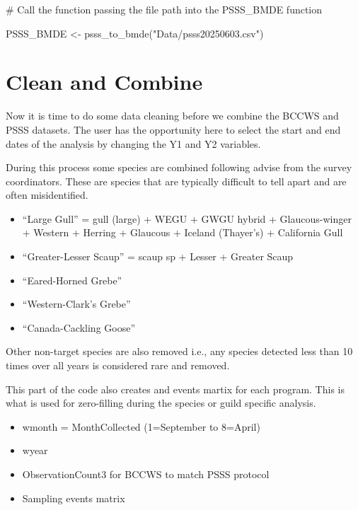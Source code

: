 \documentclass[
  letterpaper,
  DIV=11,
  numbers=noendperiod]{scrreprt}
\newenvironment{Shaded}{\begin{snugshade}}{\end{snugshade}}
\newcommand{\CommentTok}[1]{\textcolor[rgb]{0.37,0.37,0.37}{#1}}
\newcommand{\FunctionTok}[1]{\textcolor[rgb]{0.28,0.35,0.67}{#1}}
\newcommand{\NormalTok}[1]{\textcolor[rgb]{0.00,0.23,0.31}{#1}}
\newcommand{\OtherTok}[1]{\textcolor[rgb]{0.00,0.23,0.31}{#1}}
\newcommand{\StringTok}[1]{\textcolor[rgb]{0.13,0.47,0.30}{#1}}
\providecommand{\tightlist}{%
  \setlength{\itemsep}{0pt}\setlength{\parskip}{0pt}}\usepackage{longtable,booktabs,array}
\begin{document}
\begin{Shaded}
\begin{Highlighting}[]
\CommentTok{\# Call the function passing the file path into the PSSS\_BMDE function}

\NormalTok{PSSS\_BMDE }\OtherTok{\textless{}{-}} \FunctionTok{psss\_to\_bmde}\NormalTok{(}\StringTok{"Data/psss20250603.csv"}\NormalTok{)}
\end{Highlighting}
\end{Shaded}

\section{Clean and Combine}\label{2.3Data}

Now it is time to do some data cleaning before we combine the BCCWS and
PSSS datasets. The user has the opportunity here to select the start and
end dates of the analysis by changing the Y1 and Y2 variables.

During this process some species are combined following advise from the
survey coordinators. These are species that are typically difficult to
tell apart and are often misidentified.

\begin{itemize}
\item
  ``Large Gull'' = gull (large) + WEGU + GWGU hybrid + Glaucous-winger +
  Western + Herring + Glaucous + Iceland (Thayer's) + California Gull
\item
  ``Greater-Lesser Scaup'' = scaup sp + Lesser + Greater Scaup
\item
  ``Eared-Horned Grebe''
\item
  ``Western-Clark's Grebe''
\item
  ``Canada-Cackling Goose''
\end{itemize}

Other non-target species are also removed i.e., any species detected
less than 10 times over all years is considered rare and removed.

This part of the code also creates and events martix for each program.
This is what is used for zero-filling during the species or guild
specific analysis.

\begin{itemize}
\tightlist
\item
  wmonth = MonthCollected (1=September to 8=April)
\item
  wyear
\item
  ObservationCount3 for BCCWS to match PSSS protocol
\item
  Sampling events matrix
\end{itemize}
\end{document}
